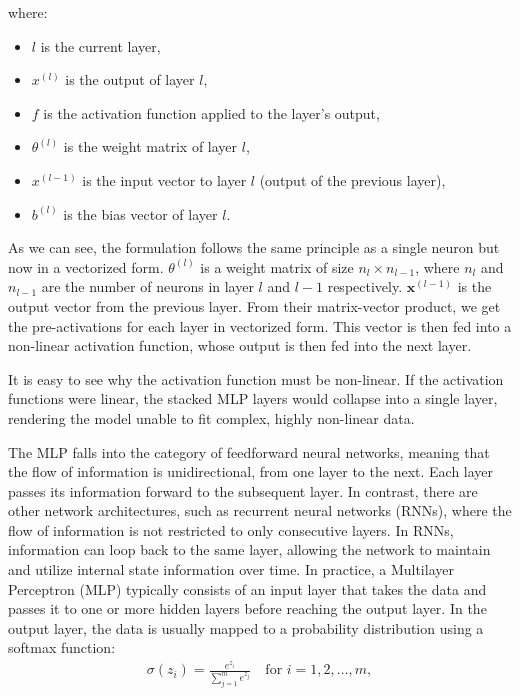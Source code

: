 where:
\begin{itemize}
    \item \( l \) is the current layer,
    \item \( x^{(l)} \) is the output of layer \( l \),
    \item \( f \) is the activation function applied to the layer's output,
    \item \( \theta^{(l)} \) is the weight matrix of layer \( l \),
    \item \( x^{(l-1)} \) is the input vector to layer \( l \) (output of the previous layer),
    \item \( b^{(l)} \) is the bias vector of layer \( l \).
\end{itemize}
As we can see, the formulation follows the same principle as a single neuron but now in a vectorized form. 
\( \theta^{(l)}  \) is a weight matrix of size \( n_{l} \times n_{l-1} \), where $n_{l}$ and $n_{l-1}$ are the number of neurons in layer $l$ and $l-1$ respectively.
\( \mathbf{x}^{(l-1)} \) is the output vector from the previous layer.
From their matrix-vector product, we get the pre-activations for each layer in vectorized form.
This vector is then fed into a non-linear activation function, whose output is then fed into the next layer.

It is easy to see why the activation function must be non-linear.
If the activation functions were linear, the stacked MLP layers would collapse into a single layer,
rendering the model unable to fit complex, highly non-linear data.\cite{Goodfellow-et-al-2016}

The MLP falls into the category of feedforward neural networks, meaning that the flow of information is unidirectional,
from one layer to the next. Each layer passes its information forward to the subsequent layer.
In contrast, there are other network architectures, such as recurrent neural networks (RNNs),
where the flow of information is not restricted to only consecutive layers. In RNNs, information can loop back to the same layer, 
allowing the network to maintain and utilize internal state information over time.
In practice, a Multilayer Perceptron (MLP) typically consists of an input layer that takes the data 
and passes it to one or more hidden layers before reaching the output layer.
In the output layer, the data is usually mapped to a probability distribution using a softmax function:
\begin{align}
\sigma(z_i) = \frac{e^{z_i}}{\sum_{j=1}^{m} e^{z_j}} \quad \text{for } i = 1, 2, \ldots, m ,
\end{align}

